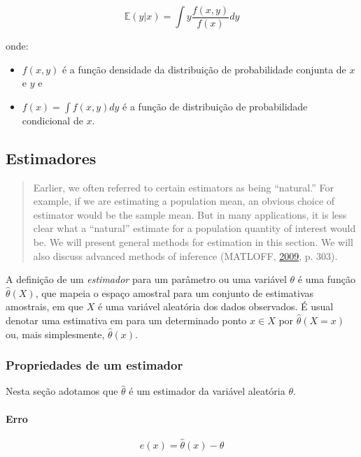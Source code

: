 \documentclass[a4paper, 12pt]{article}
\providecommand{\tightlist}{%
  \setlength{\itemsep}{0pt}\setlength{\parskip}{0pt}}
\let\oldparagraph\paragraph
\renewcommand{\paragraph}[1]{\oldparagraph{#1}\mbox{}}
\begin{document}
\[\mathbb{E}(y|x) = \int{y} \frac{f(x,y)}{f(x)}dy\]

onde:

\begin{itemize}
\tightlist
\item
  \(f(x,y)\) é a função densidade da distribuição de probabilidade
  conjunta de \(x\) e \(y\) e
\item
  \(f(x) = \int{f(x,y)dy}\) é a função de distribuição de probabilidade
  condicional de \(x\).
\end{itemize}

\subsection{Estimadores}\label{estimadores}

\begin{quote}
Earlier, we often referred to certain estimators as being ``natural.''
For example, if we are estimating a population mean, an obvious choice
of estimator would be the sample mean. But in many applications, it is
less clear what a ``natural'' estimate for a population quantity of
interest would be. We will present general methods for estimation in
this section. We will also discuss advanced methods of inference
(MATLOFF, \protect\hyperlink{ref-matloff2009}{2009}, p. 303).
\end{quote}

A definição de um \emph{estimador} para um parâmetro ou uma variável
\(\theta\) é uma função \(\hat{\theta}(X)\), que mapeia o espaço
amostral para um conjunto de estimativas amostrais, em que \(X\) é uma
variável aleatória dos dados observados. É usual denotar uma estimativa
em para um determinado ponto \(x \in X\) por \(\hat{\theta}(X = x)\) ou,
mais simplesmente, \(\hat{\theta}(x)\).

\subsubsection{Propriedades de um
estimador}\label{propriedades-de-um-estimador}

Nesta seção adotamos que \(\hat{\theta}\) é um estimador da variável
aleatória \(\theta\).

\paragraph{Erro}\label{erro}

\[e(x) = \hat{\theta}(x) - \theta\]
\end{document}
